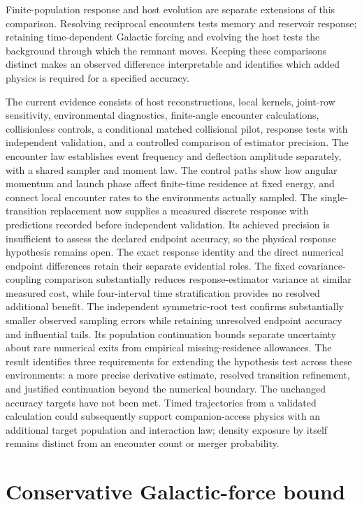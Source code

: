 \documentclass[aps,prd,reprint,amsmath,amssymb,superscriptaddress,nofootinbib,longbibliography,floatfix]{revtex4-2}
\begin{document}
Finite-population response and host evolution are separate extensions of this comparison. Resolving reciprocal encounters tests memory and reservoir response; retaining time-dependent Galactic forcing and evolving the host tests the background through which the remnant moves. Keeping these comparisons distinct makes an observed difference interpretable and identifies which added physics is required for a specified accuracy.

The current evidence consists of host reconstructions, local kernels, joint-row sensitivity, environmental diagnostics, finite-angle encounter calculations, collisionless controls, a conditional matched collisional pilot, response tests with independent validation, and a controlled comparison of estimator precision. The encounter law establishes event frequency and deflection amplitude separately, with a shared sampler and moment law. The control paths show how angular momentum and launch phase affect finite-time residence at fixed energy, and connect local encounter rates to the environments actually sampled. The single-transition replacement now supplies a measured discrete response with predictions recorded before independent validation. Its achieved precision is insufficient to assess the declared endpoint accuracy, so the physical response hypothesis remains open. The exact response identity and the direct numerical endpoint differences retain their separate evidential roles. The fixed covariance-coupling comparison substantially reduces response-estimator variance at similar measured cost, while four-interval time stratification provides no resolved additional benefit. The independent symmetric-root test confirms substantially smaller observed sampling errors while retaining unresolved endpoint accuracy and influential tails. Its population continuation bounds separate uncertainty about rare numerical exits from empirical missing-residence allowances. The result identifies three requirements for extending the hypothesis test across these environments: a more precise derivative estimate, resolved transition refinement, and justified continuation beyond the numerical boundary. The unchanged accuracy targets have not been met. Timed trajectories from a validated calculation could subsequently support companion-access physics with an additional target population and interaction law; density exposure by itself remains distinct from an encounter count or merger probability.

\appendix
\section{Conservative Galactic-force bound}\label{app:force-bound}
\end{document}

